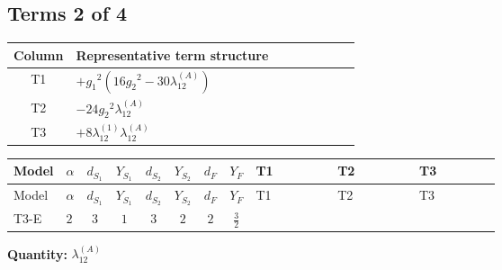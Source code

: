 \documentclass[8pt]{article}
\begin{document}
\begin{landscape}
\subsection*{Terms 2 of 4}
\begin{center}
\begin{tabular}{@{}c >{\raggedright\arraybackslash}p{0.82\linewidth}@{}}
\toprule
Column & Representative term structure \\
\midrule
T1 & \(\displaystyle +{g_1}^2 \left(16 {g_2}^2-30 {\lambda_{12}^{(A)}}\right)\) \\
\midrule
T2 & \(\displaystyle -24 {g_2}^2 {\lambda_{12}^{(A)}}\) \\
\midrule
T3 & \(\displaystyle +8 {\lambda_{12}^{(1)}} {\lambda_{12}^{(A)}}\) \\
\midrule
\bottomrule
\end{tabular}
\end{center}
\smallskip
\tiny
\begin{longtable}{@{}llcccccc >{\raggedright\arraybackslash}p{0.21\linewidth} >{\raggedright\arraybackslash}p{0.21\linewidth} >{\raggedright\arraybackslash}p{0.21\linewidth}@{}}
\toprule
Model & $\alpha$ & $d_{S_1}$ & $Y_{S_1}$ & $d_{S_2}$ & $Y_{S_2}$ & $d_F$ & $Y_F$ & T1 & T2 & T3 \\
\midrule
\endfirsthead
\toprule
Model & $\alpha$ & $d_{S_1}$ & $Y_{S_1}$ & $d_{S_2}$ & $Y_{S_2}$ & $d_F$ & $Y_F$ & T1 & T2 & T3 \\
\midrule
\endhead
T3-E & $2$ & $3$ & $1$ & $3$ & $2$ & $2$ & $\frac{3}{2}$ & \scriptsize\adjustbox{max width=\linewidth}{$\begin{gathered} +{g_1}^2 \left(16 {g_2}^2-30 {\lambda_{12}^{(A)}}\right)\end{gathered}$} & \scriptsize\adjustbox{max width=\linewidth}{$\begin{gathered} -24 {g_2}^2 {\lambda_{12}^{(A)}}\end{gathered}$} & \scriptsize\adjustbox{max width=\linewidth}{$\begin{gathered} +8 {\lambda_{12}^{(1)}} {\lambda_{12}^{(A)}}\end{gathered}$} \\
\midrule
\bottomrule
\end{longtable}
\clearpage
\noindent\textbf{Quantity: }$\lambda_{12}^{(A)}$\par\smallskip

\end{landscape}
\end{document}
